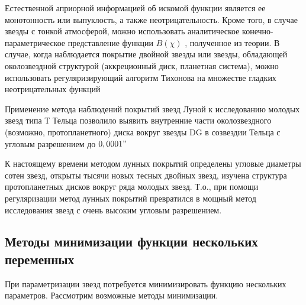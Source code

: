 \documentclass[12pt, a4paper]{article}
\begin{document}
	Естественной априорной информацией об искомой функции является ее монотонность или выпуклость, а также неотрицательность. Кроме того, в случае звезды с тонкой атмосферой, можно использовать аналитическое конечно-параметрическое представление функции $B(\chi)$ , полученное из теории. В случае, когда наблюдается покрытие двойной звезды или звезды, обладающей околозвездной структурой (аккреционный диск, планетная система), можно использовать регуляризирующий алгоритм Тихонова на множестве гладких неотрицательных функций

	Применение метода наблюдений покрытий звезд Луной к исследованию молодых звезд типа $Т$ Тельца позволило выявить внутренние части околозвездного (возможно, протопланетного) диска вокруг звезды DG в созвездии Тельца с угловым разрешением до $0,0001"$
	
	К настоящему времени методом лунных покрытий определены угловые диаметры сотен звезд, открыты тысячи новых тесных двойных звезд, изучена структура протопланетных дисков вокруг ряда молодых звезд. Т.о., при помощи регуляризации метод лунных покрытий превратился в мощный метод исследования звезд с очень высоким угловым разрешением.
	\subsection*{Методы минимизации функции нескольких переменных}
	При параметризации звезд потребуется минимизировать функцию нескольких параметров. Рассмотрим возможные методы минимизации.
\end{document}
